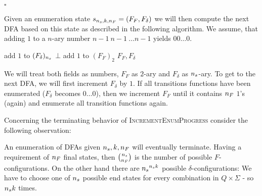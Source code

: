 \begin{example}
\begin{tabbing}
{
	}\end{tabbing}\vspace{-0.5cm}\hfill$\square$
\end{example}

\noindent Given an enumeration state $s_{{n_s}, k, {n_F}} = (F_F, F_\delta)$ we will then compute the next DFA based on this state as described in the following algorithm. We assume, that adding $1$ to a $n$-ary number $n-1\ n-1\ \ldots n-1$ yields $00\ldots0$.
\vspace{0.2cm}
\begin{algorithmic}[1]
	\State add $1$ to $(F_\delta)_{n_s}$
			\State \Return $\bot$
		\EndIf
			\State add $1$ to $(F_F)_2$
		\EndWhile
	\EndIf
	\State \Return $F_F, F_\delta$
	\EndFunction
\end{algorithmic}
\vspace{0.2cm} We will treat both fields as numbers, $F_F$ as $2$-ary and $F_\delta$ as ${n_s}$-ary. To get to the next DFA, we will first increment $F_\delta$ by $1$. If all transitions functions have been enumerated ($F_\delta$ becomes $0\ldots0$), then we increment $F_F$ until it contains ${n_F}$ $1$'s (again) and enumerate all transition functions again.

Concerning the terminating behavior of \textsc{IncrementEnumProgress} consider the following observation:


\begin{observation}
	An enumeration of DFAs given ${n_s}, k, {n_F}$ will eventually terminate. Having a requirement of ${n_F}$ final states, then $\binom{{n_s}}{{n_F}}$ is the number of possible $F$-configurations. On the other hand there are ${n_s}^{{n_s}k}$ possible $\delta$-configurations: We have to choose one of ${n_s}$ possible end states for every combination in $Q\times\Sigma$ - so ${n_s}k$ times.
\end{observation}

